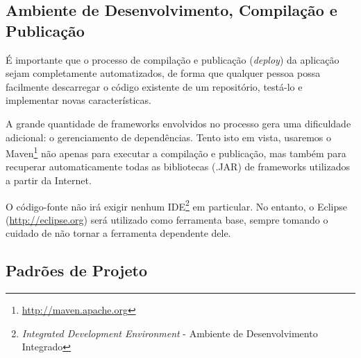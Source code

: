 \documentclass{abnt}
\begin{document}
\subsection{Ambiente de Desenvolvimento, Compilação e Publicação}

É importante que o processo de compilação e publicação (\textit{deploy}) da aplicação sejam completamente automatizados, de forma que qualquer pessoa possa facilmente descarregar o código existente de um repositório, testá-lo e implementar novas características.

A grande quantidade de frameworks envolvidos no processo gera uma dificuldade adicional: o gerenciamento de dependências. Tento isto em vista, usaremos o Maven\footnote{\url{http://maven.apache.org}} não apenas para executar a compilação e publicação, mas também para recuperar automaticamente todas as bibliotecas (.JAR) de frameworks utilizados a partir da Internet.

O código-fonte não irá exigir nenhum IDE\footnote{\textit{Integrated Development Environment} - Ambiente de Desenvolvimento Integrado} em particular. No entanto, o Eclipse (\url{http://eclipse.org}) será utilizado como ferramenta base, sempre tomando o cuidado de não tornar a ferramenta dependente dele. 




\subsection{Padrões de Projeto}
\end{document}
